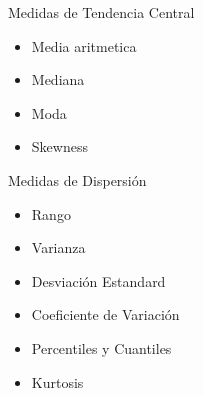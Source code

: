 \documentclass{beamer}
\theoremstyle{definition}
\theoremstyle{remark}
\begin{document}
\begin{frame}{Medidas de Tendencia Central}

\begin{itemize}
\item Media aritmetica
\item Mediana
\item Moda
\item Skewness
\end{itemize} 
\end{frame}

\begin{frame}{Medidas de Dispersi\'on}

\begin{itemize}
\item Rango
\item Varianza
\item Desviaci\'on Estandard
\item Coeficiente de Variaci\'on
\item Percentiles y Cuantiles
\item Kurtosis
\end{itemize} 
\end{frame}
\end{document}
